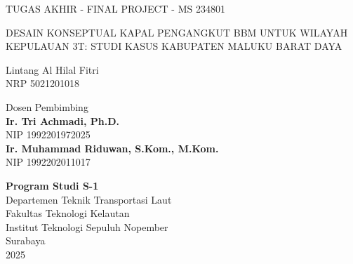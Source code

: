 {\large TUGAS AKHIR - FINAL PROJECT - MS 234801}

\vspace{8ex}

\begin{Large}
  DESAIN KONSEPTUAL KAPAL PENGANGKUT BBM UNTUK WILAYAH KEPULAUAN 3T: STUDI KASUS KABUPATEN MALUKU BARAT DAYA
\end{Large}

\vspace{10ex}

\begin{large}
  

Lintang Al Hilal Fitri \\
NRP 5021201018

\vspace{4ex}

Dosen Pembimbing \\
\textbf{Ir. Tri Achmadi, Ph.D.}\\
NIP 1992201972025 \\
\textbf{Ir. Muhammad Riduwan, S.Kom., M.Kom.}\\
NIP 1992202011017

\end{large}

\vspace{8ex}

\textbf{Program Studi S-1} \\
Departemen Teknik Transportasi Laut \\
Fakultas Teknologi Kelautan \\
Institut Teknologi Sepuluh Nopember \\
Surabaya \\
2025
